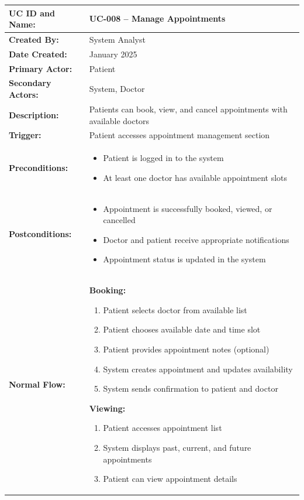 \documentclass[12pt,a4paper]{article}
\begin{document}
\renewcommand{\arraystretch}{1.5}
\begin{longtable}{|p{4.5cm}|p{10.5cm}|}
\hline
\textbf{UC ID and Name:} & UC-008 – Manage Appointments \\
\hline
\textbf{Created By:} & System Analyst \\
\hline
\textbf{Date Created:} & January 2025 \\
\hline
\textbf{Primary Actor:} & Patient \\
\hline
\textbf{Secondary Actors:} & System, Doctor \\
\hline
\textbf{Description:} & Patients can book, view, and cancel appointments with available doctors \\
\hline
\textbf{Trigger:} & Patient accesses appointment management section \\
\hline
\textbf{Preconditions:} &
\begin{itemize}
  \item Patient is logged in to the system
  \item At least one doctor has available appointment slots
\end{itemize} \\
\hline
\textbf{Postconditions:} &
\begin{itemize}
  \item Appointment is successfully booked, viewed, or cancelled
  \item Doctor and patient receive appropriate notifications
  \item Appointment status is updated in the system
\end{itemize} \\
\hline
\textbf{Normal Flow:} &
\textbf{Booking:}
\begin{enumerate}
  \item Patient selects doctor from available list
  \item Patient chooses available date and time slot
  \item Patient provides appointment notes (optional)
  \item System creates appointment and updates availability
  \item System sends confirmation to patient and doctor
\end{enumerate}
\textbf{Viewing:}
\begin{enumerate}
  \item Patient accesses appointment list
  \item System displays past, current, and future appointments
  \item Patient can view appointment details

\end{enumerate}
\end{longtable}
\end{document}
